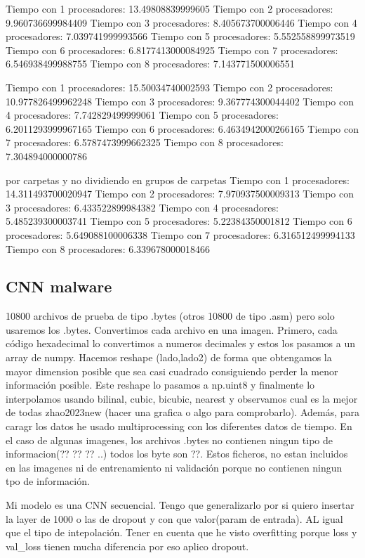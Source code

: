 \documentclass[11pt, a4paper]{article} %
\begin{document}
Tiempo con 1 procesadores: 13.49808839999605
Tiempo con 2 procesadores: 9.960736699984409
Tiempo con 3 procesadores: 8.405673700006446
Tiempo con 4 procesadores: 7.039741999993566
Tiempo con 5 procesadores: 5.552558899973519
Tiempo con 6 procesadores: 6.8177413000084925
Tiempo con 7 procesadores: 6.546938499988755
Tiempo con 8 procesadores: 7.143771500006551

Tiempo con 1 procesadores: 15.50034740002593
Tiempo con 2 procesadores: 10.977826499962248
Tiempo con 3 procesadores: 9.367774300044402
Tiempo con 4 procesadores: 7.742829499999061
Tiempo con 5 procesadores: 6.2011293999967165
Tiempo con 6 procesadores: 6.4634942000266165
Tiempo con 7 procesadores: 6.5787473999662325
Tiempo con 8 procesadores: 7.304894000000786


por carpetas y no dividiendo en grupos de carpetas
Tiempo con 1 procesadores: 14.311493700020947
Tiempo con 2 procesadores: 7.970937500009313
Tiempo con 3 procesadores: 6.433522899984382
Tiempo con 4 procesadores: 5.485239300003741
Tiempo con 5 procesadores: 5.22384350001812
Tiempo con 6 procesadores: 5.649088100006338
Tiempo con 7 procesadores: 6.316512499994133
Tiempo con 8 procesadores: 6.339678000018466


\subsection{CNN malware}


10800 archivos de prueba de tipo .bytes (otros 10800 de tipo .asm) pero solo usaremos los .bytes. Convertimos cada archivo en una imagen. Primero, cada código hexadecimal lo convertimos a numeros decimales y estos los pasamos a un array de numpy. Hacemos reshape (lado,lado2) de forma que obtengamos la mayor dimension posible que sea casi cuadrado consiguiendo perder la menor información posible. Este reshape lo pasamos a np.uint8 y finalmente lo interpolamos usando bilinal, cubic, bicubic, nearest y observamos cual es la mejor de todas {zhao2023new} (hacer una grafica o algo para comprobarlo). Además, para caragr los datos he usado multiprocessing con los diferentes datos de tiempo. En el caso de algunas imagenes, los archivos .bytes no contienen ningun tipo de informacion(?? ?? ?? ..) todos los byte son ??. Estos ficheros, no estan incluidos en las imagenes ni de entrenamiento ni validación porque no contienen ningun tpo de información. 

Mi modelo es una CNN secuencial. Tengo que generalizarlo por si quiero insertar la layer de 1000 o las de dropout y con que valor(param de entrada). AL igual que el tipo de intepolación. Tener en cuenta que he visto overfitting porque loss y val_loss tienen mucha diferencia por eso aplico dropout.
\end{document}
